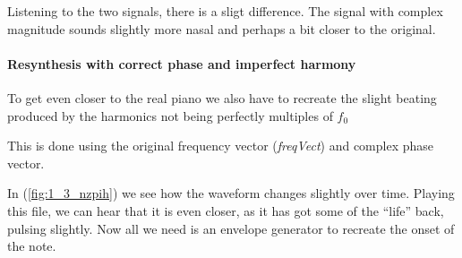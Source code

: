 Listening to the two signals, there is a sligt difference.
The signal with complex magnitude sounds slightly more nasal and perhaps a bit
closer to the original.

\paragraph{ Resynthesis with correct phase and imperfect harmony }
To get even closer to the real piano we also have to recreate the slight beating
produced by the harmonics not being perfectly multiples of $f_0$

This is done using the original frequency vector (\emph{freqVect}) and complex
phase vector.

In (\ref{fig:1_3_nzpih}) we see how the waveform changes slightly over time.
Playing this file, we can hear that it is even closer, as it has got some of the
``life'' back, pulsing slightly. Now all we need is an envelope generator to
recreate the onset of the note.

